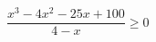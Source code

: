 \begin{ex}[type=inequality]
	\begin{condition}
		\( \dfrac{x^3-4x^2-25x+100}{4-x}\ge0 \)
	\end{condition}
	\answer{\( [-5;4)\cup(4;5] \)}
\end{ex}